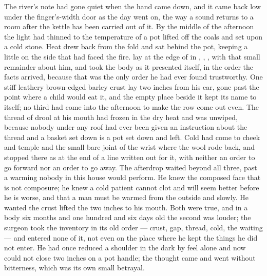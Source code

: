The river's note had gone quiet when the hand came down, and it came back low under the finger's-width door as the day went on, the way a sound returns to a room after the kettle has been carried out of it. By the middle of the afternoon the light had thinned to the temperature of a pot lifted off the coals and set upon a cold stone. Heat drew back from the fold and sat behind the pot, keeping a little on the side that had faced the fire.  lay at the edge of  in , , , with that small remainder about him, and took the body as it presented itself, in the order the facts arrived, because that was the only order he had ever found trustworthy. One stiff leathery brown-edged barley crust lay two inches from his ear, gone past the point where a child would eat it, and the empty place beside it kept its name to itself; no third had come into the afternoon to make the row come out even. The thread of drool at his mouth had frozen in the dry heat and was unwiped, because nobody under any roof had ever been given an instruction about the thread and a basket set down is a pot set down and left. Cold had come to cheek and temple and the small bare joint of the wrist where the wool rode back, and stopped there as at the end of a line written out for it, with neither an order to go forward nor an order to go away. The afterdrop waited beyond all three, past a warming nobody in this house would perform. He knew the composed face that is not composure; he knew a cold patient cannot clot and will seem better before he is worse, and that a man must be warmed from the outside and slowly. He wanted the crust lifted the two inches to his mouth. Both were true, and in a body six months and one hundred and six days old the second was louder; the surgeon took the inventory in its old order --- crust, gap, thread, cold, the waiting --- and entered none of it, not even on the place where he kept the things he did not enter. He had once reduced a shoulder in the dark by feel alone and now could not close two inches on a pot handle; the thought came and went without bitterness, which was its own small betrayal.

